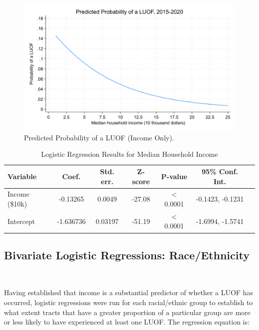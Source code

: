 \documentclass[12pt]{article}
\begin{document}
\begin{figure}[H]
  \centering %
  \includegraphics[width=\linewidth]{images/LUOF_logit_income_only}
  \captionsetup{justification=centering, singlelinecheck=false, margin=2cm}
  \caption[Predicted Probability of a LUOF (Income Only)]{Predicted Probability of a LUOF (Income Only).}
  \label{fig:logit_income_plot}
\end{figure}

\begin{table}[ht]
\centering
\begin{tabular}{lcccccc}
\toprule
\textbf{Variable} & \textbf{Coef.} & \textbf{Std. err.} & \textbf{Z-score} & \textbf{P-value} & \textbf{95\% Conf. Int.} \\
\midrule
Income (\$10k) & -0.13265 & 0.0049 & -27.08 & $<$0.0001 & -0.1423, -0.1231 \\
Intercept & -1.636736 & 0.03197 & -51.19 & $<$0.0001 & -1.6994, -1.5741 \\
\bottomrule
\end{tabular}
\caption{Logistic Regression Results for Median Household Income}
\label{tab:income_logit}
\end{table}

\subsection{Bivariate Logistic Regressions: Race/Ethnicity}\

Having established that income is a substantial predictor of whether a LUOF has occurred, logistic regressions were run for each racial/ethnic group to establish to what extent tracts that have a greater proportion of a particular group are more or less likely to have experienced at least one LUOF. The regression equation is:
\end{document}
